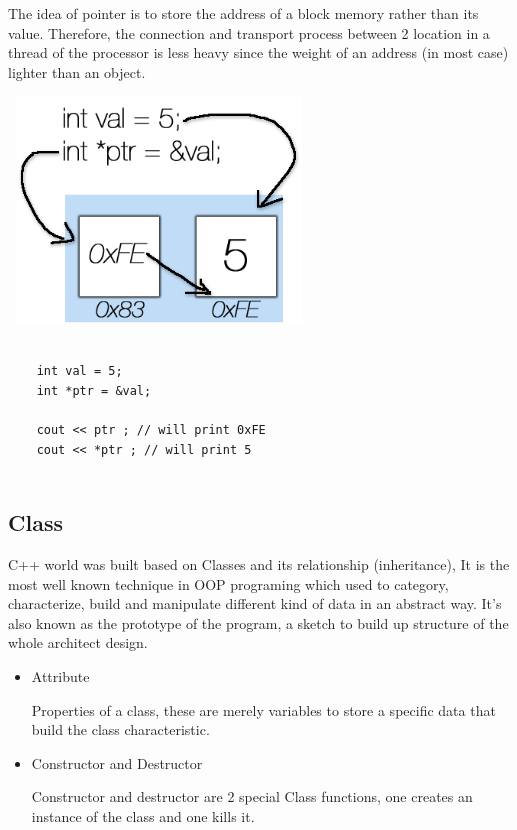 \documentclass[english]{article}
\begin{document}
{The idea of pointer is to store the address of a block memory rather than its value. Therefore, the connection and transport process between 2 location in a thread of the processor is less heavy since the weight of an address (in most case) lighter than an object.

\begin{center}
	\includegraphics[width=8cm,height=6cm]{img/pointer.png}	
\end{center}	

\lstset{language=C++}
\begin{lstlisting}

	int val = 5;
	int *ptr = &val;
	
	cout << ptr ; // will print 0xFE
	cout << *ptr ; // will print 5
	
\end{lstlisting}


\subsection{Class}
	
	C++ world was built based on Classes and its relationship (inheritance), It is the most well known technique in OOP programing which used to category, characterize, build and manipulate different kind of data in an abstract way. It's also known as the prototype of the program, a sketch to build up structure of the whole architect design. 
	
	\begin{itemize}
		\item Attribute
		
		Properties of a class, these are merely variables to store a specific data that build the class characteristic.
		
		\item Constructor and Destructor
		
		Constructor and destructor are 2 special Class functions, one creates an instance of the class and one kills it.
		

\end{itemize}}
\end{document}

